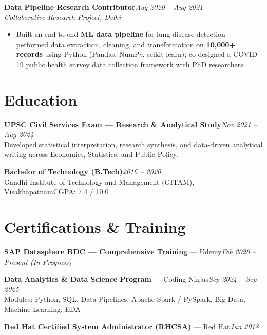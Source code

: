 \documentclass[10pt, letterpaper]{article}
\newcommand{\role}[3]{%
  \vspace{2pt}%
  {\bfseries #1}\hfill{\small\color{muted}\textit{#3}}\\[-2pt]%
  {\small\color{muted}\textit{#2}}%
}
\begin{document}
\role{Data Pipeline Research Contributor}{Collaborative Research Project, Delhi}{Aug 2020 -- Aug 2021}

\begin{itemize}
  \item Built an end-to-end \textbf{ML data pipeline} for lung disease detection — performed data extraction, cleaning, and transformation on \textbf{10,000+ records} using Python (Pandas, NumPy, scikit-learn); co-designed a COVID-19 public health survey data collection framework with PhD researchers.
\end{itemize}

\section{Education}

{\bfseries UPSC Civil Services Exam — Research \& Analytical Study}\hfill{\small\color{muted}\textit{Nov 2021 -- Aug 2024}}\\
{\small\color{muted}Developed statistical interpretation, research synthesis, and data-driven analytical writing across Economics, Statistics, and Public Policy.}

\vspace{2pt}
{\bfseries Bachelor of Technology (B.Tech)}\hfill{\small\color{muted}\textit{2016 -- 2020}}\\
{\small\color{muted}Gandhi Institute of Technology and Management (GITAM), Visakhapatnam\hfill CGPA: 7.4 / 10.0}

\section{Certifications \& Training}

{\bfseries SAP Datasphere BDC — Comprehensive Training} — Udemy\hfill{\small\color{muted}\textit{Feb 2026 -- Present \emph{(In Progress)}}}

\vspace{1pt}
{\bfseries Data Analytics \& Data Science Program} — Coding Ninjas\hfill{\small\color{muted}\textit{Sep 2024 -- Sep 2025}}\\
{\small\color{muted}Modules: Python, SQL, Data Pipelines, Apache Spark / PySpark, Big Data, Machine Learning, EDA}

\vspace{1pt}
{\bfseries Red Hat Certified System Administrator (RHCSA)} — Red Hat\hfill{\small\color{muted}\textit{Jun 2018}}

\end{document}
